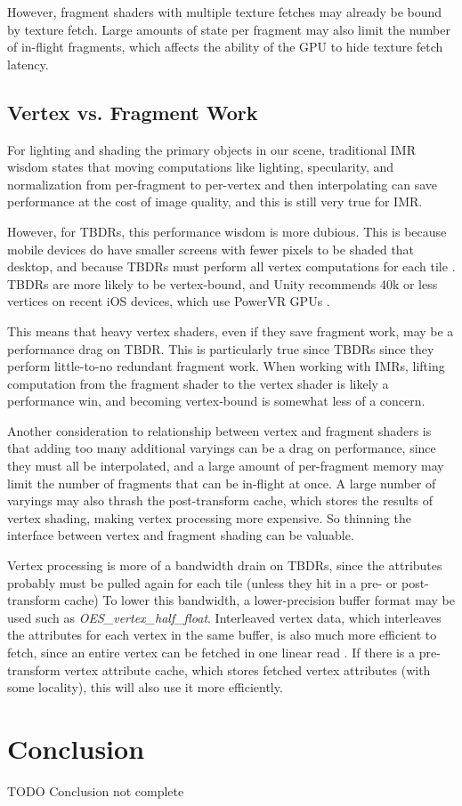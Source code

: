 However, fragment shaders with multiple texture fetches may already be bound by texture fetch.  Large amounts of state per fragment may also limit the number of in-flight fragments, which affects the ability of the GPU to hide texture fetch latency.

\subsection{Vertex vs. Fragment Work}\label{Jon-McCaffrey-Vertex-vs-Fragment-Work}

For lighting and shading the primary objects in our scene, traditional IMR wisdom states that moving computations like lighting, specularity, and normalization from per-fragment to per-vertex and then interpolating can save performance at the cost of image quality, and this is still very true for IMR.

However, for TBDRs, this performance wisdom is more dubious.  This is because mobile devices do have smaller screens with fewer pixels to be shaded that desktop, and because TBDRs must perform all vertex computations for each tile \cite{apple_vertex}.  TBDRs are more likely to be vertex-bound, and Unity recommends 40k or less vertices on recent iOS devices, which use PowerVR GPUs \cite{unity_graphics_perf}.

This means that heavy vertex shaders, even if they save fragment work, may be a
performance drag on TBDR.  This is particularly true since TBDRs since they
perform little-to-no redundant fragment work.  When working with IMRs, lifting
computation from the fragment shader to the vertex shader is likely a
performance win, and becoming vertex-bound is somewhat less of a concern.

Another consideration to relationship between vertex and fragment shaders is
that adding too many additional varyings can be a drag on performance, since
they must all be interpolated, and a large amount of per-fragment memory may
limit the number of fragments that can be in-flight at once.  A large number of
varyings may also thrash the post-transform cache, which stores the results of
vertex shading, making vertex processing more expensive.  So thinning the
interface between vertex and fragment shading can be valuable.

Vertex processing is more of a bandwidth drain on TBDRs, since the attributes probably must be pulled again for each tile (unless they hit in a pre- or post- transform cache)  To lower this bandwidth, a lower-precision buffer format may be used such as \textit{OES\_vertex\_half\_float}.  Interleaved vertex data, which interleaves the attributes for each vertex in the same buffer, is also much more efficient to fetch, since an entire vertex can be fetched in one linear read \cite{apple_vertex}.  If there is a pre-transform vertex attribute cache, which stores fetched vertex attributes (with some locality), this will also use it more efficiently.  

\section{Conclusion}\label{Jon-McCaffrey-Conclusion}

TODO Conclusion not complete














